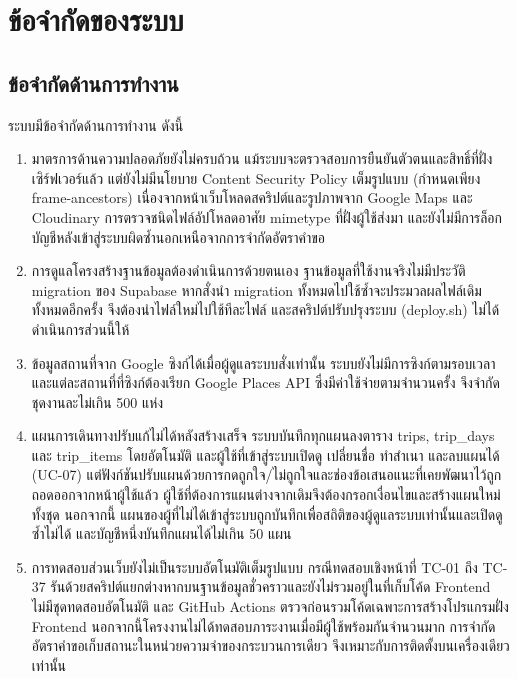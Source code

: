 \section{ข้อจำกัดของระบบ}

\subsection{ข้อจำกัดด้านการทำงาน}

ระบบมีข้อจำกัดด้านการทำงาน ดังนี้

\begin{enumerate}[label=(\arabic*),leftmargin=0pt,itemindent=\dimexpr\parindent+\parenlabelwidth+1em\relax,align=right,labelwidth=\parenlabelwidth,labelsep=1em]
\item มาตรการด้านความปลอดภัยยังไม่ครบถ้วน แม้ระบบจะตรวจสอบการยืนยันตัวตนและสิทธิ์ที่ฝั่งเซิร์ฟเวอร์แล้ว แต่ยังไม่มีนโยบาย Content Security Policy เต็มรูปแบบ (กำหนดเพียง frame-ancestors) เนื่องจากหน้าเว็บโหลดสคริปต์และรูปภาพจาก Google Maps และ Cloudinary การตรวจชนิดไฟล์อัปโหลดอาศัย mimetype ที่ฝั่งผู้ใช้ส่งมา และยังไม่มีการล็อกบัญชีหลังเข้าสู่ระบบผิดซ้ำนอกเหนือจากการจำกัดอัตราคำขอ
\item การดูแลโครงสร้างฐานข้อมูลต้องดำเนินการด้วยตนเอง ฐานข้อมูลที่ใช้งานจริงไม่มีประวัติ migration ของ Supabase หากสั่งนำ migration ทั้งหมดไปใช้ซ้ำจะประมวลผลไฟล์เดิมทั้งหมดอีกครั้ง จึงต้องนำไฟล์ใหม่ไปใช้ทีละไฟล์ และสคริปต์ปรับปรุงระบบ (deploy.sh) ไม่ได้ดำเนินการส่วนนี้ให้
\item ข้อมูลสถานที่จาก Google ซิงก์ได้เมื่อผู้ดูแลระบบสั่งเท่านั้น ระบบยังไม่มีการซิงก์ตามรอบเวลา และแต่ละสถานที่ที่ซิงก์ต้องเรียก Google Places API ซึ่งมีค่าใช้จ่ายตามจำนวนครั้ง จึงจำกัดชุดงานละไม่เกิน 500 แห่ง
\item แผนการเดินทางปรับแก้ไม่ได้หลังสร้างเสร็จ ระบบบันทึกทุกแผนลงตาราง trips, trip\_days และ trip\_items โดยอัตโนมัติ และผู้ใช้ที่เข้าสู่ระบบเปิดดู เปลี่ยนชื่อ ทำสำเนา และลบแผนได้ (UC-07) แต่ฟังก์ชันปรับแผนด้วยการกดถูกใจ/ไม่ถูกใจและช่องข้อเสนอแนะที่เคยพัฒนาไว้ถูกถอดออกจากหน้าผู้ใช้แล้ว ผู้ใช้ที่ต้องการแผนต่างจากเดิมจึงต้องกรอกเงื่อนไขและสร้างแผนใหม่ทั้งชุด นอกจากนี้ แผนของผู้ที่ไม่ได้เข้าสู่ระบบถูกบันทึกเพื่อสถิติของผู้ดูแลระบบเท่านั้นและเปิดดูซ้ำไม่ได้ และบัญชีหนึ่งบันทึกแผนได้ไม่เกิน 50 แผน
\item การทดสอบส่วนเว็บยังไม่เป็นระบบอัตโนมัติเต็มรูปแบบ กรณีทดสอบเชิงหน้าที่ TC-01 ถึง TC-37 รันด้วยสคริปต์แยกต่างหากบนฐานข้อมูลชั่วคราวและยังไม่รวมอยู่ในที่เก็บโค้ด Frontend ไม่มีชุดทดสอบอัตโนมัติ และ GitHub Actions ตรวจก่อนรวมโค้ดเฉพาะการสร้างโปรแกรมฝั่ง Frontend นอกจากนี้โครงงานไม่ได้ทดสอบภาระงานเมื่อมีผู้ใช้พร้อมกันจำนวนมาก การจำกัดอัตราคำขอเก็บสถานะในหน่วยความจำของกระบวนการเดียว จึงเหมาะกับการติดตั้งบนเครื่องเดียวเท่านั้น

\end{enumerate}
